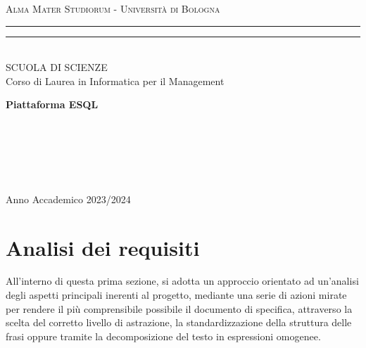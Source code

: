 \documentclass{article}
\begin{document}
\pagestyle{empty}

\begin{titlepage} 
\begin{center}
    {{\Large{\textsc{Alma Mater Studiorum - Università di Bologna}}}}
    \rule[0.1cm]{\textwidth}{0.1px}
    \rule[0.5cm]{\textwidth}{0.6px}\\
    {\large{SCUOLA DI SCIENZE \\ Corso di Laurea in Informatica per il Management}}
\end{center}

\vspace{50px}

\begin{center}
    {\LARGE{{\bf Piattaforma ESQL}}}\\
\end{center}

\vspace{115px}
\par
\noindent
\begin{minipage}[t]{0.04\textwidth}
~
\end{minipage}
\begin{minipage}[t]{0.4\textwidth}
\end{minipage}
\hfill
\begin{minipage}[t]{0.4\textwidth}\raggedleft
    {\\
}
\end{minipage}
\begin{minipage}[t]{0.04\textwidth}
~
\end{minipage}

\vspace*{210px}

\begin{center}
    \large{Anno Accademico 2023/2024}
\end{center}
\end{titlepage}

\section{Analisi dei requisiti}
\setcounter{subsection}{1}
\large
All'interno di questa prima sezione, si adotta un approccio orientato ad un'analisi degli aspetti principali inerenti al progetto, mediante una serie di azioni mirate per rendere il più comprensibile possibile il documento di specifica, attraverso la scelta del corretto livello di astrazione, la standardizzazione della struttura delle frasi oppure tramite la decomposizione del testo in espressioni omogenee.
\end{document}
